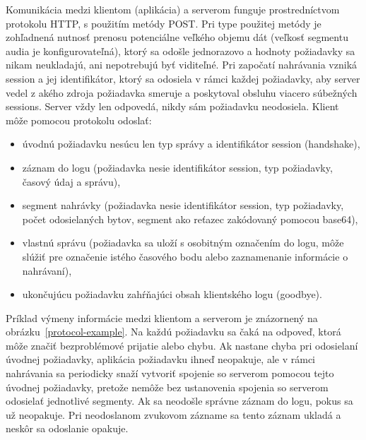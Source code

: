Komunikácia medzi klientom (aplikácia) a serverom funguje prostredníctvom protokolu HTTP, s použitím metódy POST. Pri type použitej metódy je zohľadnená nutnosť prenosu potenciálne veľkého objemu dát (veľkosť segmentu audia je konfigurovateľná), ktorý sa odošle jednorazovo a hodnoty požiadavky sa nikam neukladajú, ani nepotrebujú byť viditeľné. Pri započatí nahrávania vzniká session a jej identifikátor, ktorý sa odosiela v rámci každej požiadavky, aby server vedel z akého zdroja požiadavka smeruje a poskytoval obsluhu viacero súbežných sessions. Server vždy len odpovedá, nikdy sám požiadavku neodosiela. Klient môže pomocou protokolu odoslať:
\begin{itemize}
\item{úvodnú požiadavku nesúcu len typ správy a identifikátor session (handshake),}
\item{záznam do logu (požiadavka nesie identifikátor session, typ požiadavky, časový údaj a správu),}
\item{segment nahrávky (požiadavka nesie identifikátor session, typ požiadavky, počet odosielaných bytov, segment ako reťazec zakódovaný pomocou base64),}
\item{vlastnú správu (požiadavka sa uloží s osobitným označením do logu, môže slúžiť pre označenie istého časového bodu alebo zaznamenanie informácie o nahrávaní),}
\item{ukončujúcu požiadavku zahŕňajúci obsah klientského logu (goodbye).}
\end{itemize}

Príklad výmeny informácie medzi klientom a serverom je znázornený na obrázku~\ref{protocol-example}. Na každú požiadavku sa čaká na odpoveď, ktorá môže značiť bezproblémové prijatie alebo chybu. Ak nastane chyba pri odosielaní úvodnej požiadavky, aplikácia požiadavku ihneď neopakuje, ale v rámci nahrávania sa periodicky snaží vytvoriť spojenie so serverom pomocou tejto úvodnej požiadavky, pretože nemôže bez ustanovenia spojenia so serverom odosielať jednotlivé segmenty. Ak sa neodošle správne záznam do logu, pokus sa už neopakuje. Pri neodoslanom zvukovom zázname sa tento záznam ukladá a neskôr sa odoslanie opakuje.

